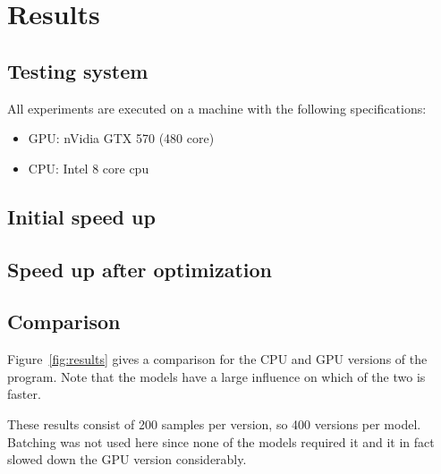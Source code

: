 \section{Results}
\subsection{Testing system} \label{sec:system}
All experiments are executed on a machine with the following specifications:
\begin{itemize}
  \item GPU: nVidia GTX 570 (480 core)
  \item CPU: Intel 8 core cpu
\end{itemize}
\subsection{Initial speed up}
\subsection{Speed up after optimization}

\subsection{Comparison}
	Figure~\ref{fig:results} gives a comparison for the CPU and GPU versions of the program.
	Note that the models have a large influence on which of the two is faster.
	
	These results consist of 200 samples per version, so 400 versions per model.
	Batching was not used here since none of the models required it and it in fact slowed down the GPU version considerably.
	
